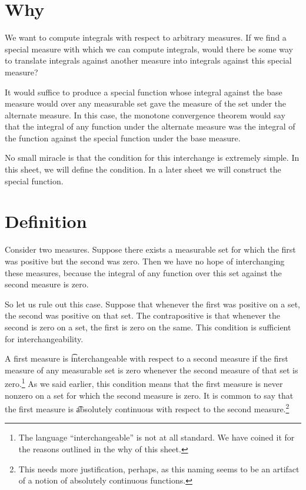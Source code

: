 

\section*{Why}

We want to compute integrals with respect to arbitrary measures.
If we find a special measure with which we can compute integrals, would there be some way to translate integrals against another measure into integrals against this special measure?

It would suffice to produce a special function
whose integral against the base measure
would over any measurable set gave
the measure of the set under the alternate
measure.
In this case, the monotone convergence
theorem would say that the integral of
any function under the alternate
measure was the integral of the function
against the special function under the
base measure.

No small miracle is that the condition
for this interchange is extremely simple.
In this sheet, we will define the
condition. In a later sheet we will
construct the special function.

\section*{Definition}

Consider two measures.
Suppose there exists a measurable set for which the first was positive but the second was zero.
Then we have no hope of interchanging these measures, because the integral of any function over this set against the second measure is zero.

So let us rule out this case.
Suppose that whenever the first was positive on a set, the second was positive on that set.
The contrapositive is that whenever the second is zero on a set, the first is zero on the same.
This condition is sufficient for interchangeability.

A first measure is \t{interchangeable} with respect to a second measure if the first measure of any measurable set is zero whenever the second measure of that set is zero.\footnote{The language ``interchangeable'' is not at all standard. We have coined it for the reasons outlined in the why of this sheet.}
As we said earlier, this condition means that the first measure is never nonzero on a set for which the second measure is zero.
It is common to say that the first measure is \t{absolutely continuous} with respect to the second measure.\footnote{This needs more justification, perhaps, as this naming seems to be an artifact of a notion of absolutely continuous functions.}

